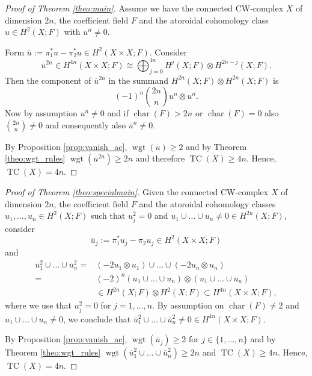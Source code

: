 \documentclass[a4paper,twoside]{article}
\theoremstyle{plain}
\theoremstyle{definition}
\theoremstyle{remark}
\newcommand{\tensor}{\otimes}
\newcommand{\iso}{\cong}
\DeclareMathOperator{\characteristic}{char}
\DeclareMathOperator{\TC}{TC}
\DeclareMathOperator{\wgt}{wgt}
\begin{document}
\begin{proof}[Proof of Theorem \ref{theo:main}]
  Assume we have the connected CW-complex $X$ of dimension $2n$, the coefficient field
  $F$ and the atoroidal cohomology class $u\in H^2(X;F)$ with $u^n\ne 0$.

  Form $\overline u:=\pi_1^*u-\pi_2^*u\in H^2(X\times X;F)$. Consider
  \begin{equation*}
    \overline u^{2n}\in H^{4n}(X\times X;F)\iso \bigoplus_{j=0}^{4n}
    H^j(X;F)\tensor H^{2n-j}(X;F).
  \end{equation*}
  Then the component of
  $\overline u^{2n}$ in the summand $H^{2n}(X;F)\tensor H^{2n}(X;F)$ is
  \begin{equation*}
    (-1)^n \binom{2n}{n} u^n \tensor u^n.
  \end{equation*}
  Now by assumption $u^n\ne 0$ and if $\characteristic(F)>2n$ or $\characteristic(F)=0$ also
  $\binom{2n}{n}\ne 0$ and consequently also $\overline u^n\ne 0$.

  By Proposition \ref{prop:vanish_ac}, $\wgt(\overline u)\ge 2$ and by Theorem
  \ref{theo:wgt_rules} $\wgt(\overline u^{2n})\ge 2n$ and therefore $\TC(X)\ge 4n$.
  Hence, $\TC(X)=4n$.
\end{proof}


\begin{proof}[Proof of Theorem \ref{theo:specialmain}] 
   Given the connected CW-complex $X$ of dimension $2n$, the coefficient field
   $F$ and the atoroidal
   cohomology classes $u_1,\dots,u_n\in H^2(X;F)$ such that $u_j^2=0$ and
   $u_1\cup\dots\cup u_n\ne 0\in H^{2n}(X;F)$, consider
   \begin{equation*}
     \overline u_j:=
     \pi_1^*u_j-\pi_2u_j\in H^2(X\times X;F)
   \end{equation*}
   and
   \begin{equation*}
     \begin{split}
       \overline u_1^2\cup\dots\cup
       \overline u_n^2 =&  (-2u_1\tensor u_1) \cup \dots \cup (-2u_n\tensor u_n)
       \\
       =&
         (-2)^n (u_1 \cup \dots \cup u_n)\tensor (u_1 \cup \dots \cup u_n)\\
       & \in H^{2n}(X;F)\tensor
       H^2(X;F) \subset H^{4n}(X\times X;F),
     \end{split}
   \end{equation*}
   where we use that $u_j^2=0$ for $j=1,\dots,n$. By assumption on
$\characteristic(F)\ne 2$ and $u_1 \cup \dots \cup u_n\ne 0$, we conclude that
   $\overline u_1^2 \cup \dots \cup \overline u_n^2\ne 0\in H^{4n}(X\times X;F)$.

   By Proposition \ref{prop:vanish_ac}, $\wgt(\overline u_j)\ge 2$ for $j\in
   \{1,\dots,n\}$ and by Theorem 
  \ref{theo:wgt_rules} $\wgt(\overline u_1^{2}\cup\dots\cup \overline u_n^2)
  \ge 2n$ and $\TC(X)\ge 4n$. Hence, $\TC(X)=4n$.
\end{proof}
\end{document}
